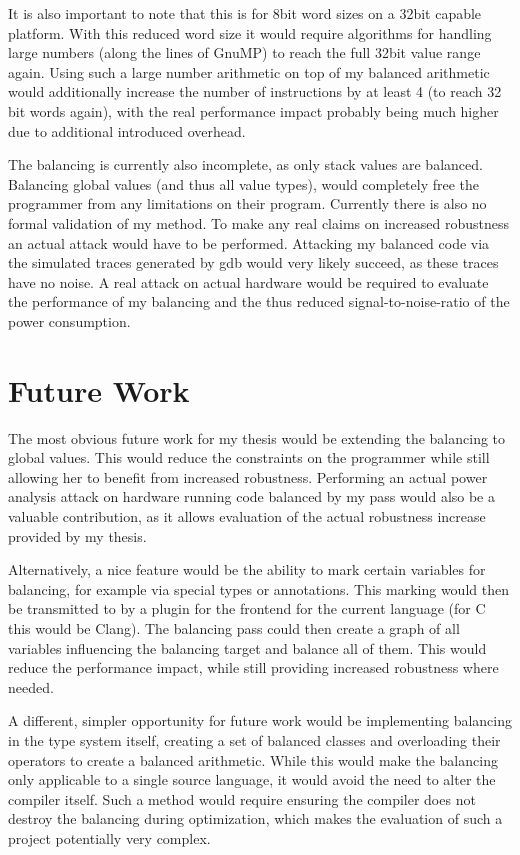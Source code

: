 It is also important to note that this is for 8bit word sizes on a 32bit capable platform.
With this reduced word size it would require algorithms for handling large numbers (along the lines of GnuMP\cite{granlund1996gnu}) to reach the full 32bit value range again.
Using such a large number arithmetic on top of my balanced arithmetic would additionally increase the number of instructions by at least 4 (to reach 32 bit words again), with the real performance impact probably being much higher due to additional introduced overhead.

The balancing is currently also incomplete, as only stack values are balanced.
Balancing global values (and thus all value types), would completely free the programmer from any limitations on their program.
Currently there is also no formal validation of my method.
To make any real claims on increased robustness an actual attack would have to be performed.
Attacking my balanced code via the simulated traces generated by gdb would very likely succeed, as these traces have no noise.
A real attack on actual hardware would be required to evaluate the performance of my balancing and the thus reduced signal-to-noise-ratio of the power consumption.

\section{Future Work}
The most obvious future work for my thesis would be extending the balancing to global values.
This would reduce the constraints on the programmer while still allowing her to benefit from increased robustness.
Performing an actual power analysis attack on hardware running code balanced by my pass would also be a valuable contribution, as it allows evaluation of the actual robustness increase provided by my thesis.

Alternatively, a nice feature would be the ability to mark certain variables for balancing, for example via special types or annotations.
This marking would then be transmitted to \ir{} by a plugin for the frontend for the current language (for C this would be Clang).
The balancing pass could then create a graph of all variables influencing the balancing target and balance all of them.
This would reduce the performance impact, while still providing increased robustness where needed.

A different, simpler opportunity for future work would be implementing balancing in the type system itself, creating a set of balanced classes and overloading their operators to create a balanced arithmetic.
While this would make the balancing only applicable to a single source language, it would avoid the need to alter the compiler itself.
Such a method would require ensuring the compiler does not destroy the balancing during optimization, which makes the evaluation of such a project potentially very complex.

